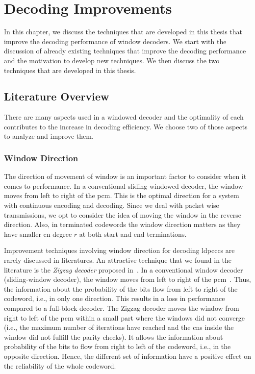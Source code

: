 \chapter{Decoding Improvements}\label{ch:dec_improve}
In this chapter, we discuss the techniques that are developed in this thesis that improve the decoding performance of window decoders. We start with the discussion of already existing techniques that improve the decoding performance and the motivation to develop new techniques. We then discuss the two techniques that are developed in this thesis.

\section{Literature Overview}
There are many aspects used in a windowed decoder and the optimality of each contributes to the increase in decoding efficiency. We choose two of those aspects to analyze and improve them.
\subsection{Window Direction}
The direction of movement of window is an important factor to consider when it comes to performance. In a conventional sliding-windowed decoder, the window moves from left to right of the \gls{pcm}. This is the optimal direction for a system with continuous encoding and decoding. Since we deal with packet wise transmissions, we opt to consider the idea of moving the window in the reverse direction. Also, in terminated codewords the window direction matters as they have smaller \gls{cn} degree $r$ at both start and end terminations.

Improvement techniques involving window direction for decoding \glspl{ldpccc} are rarely discussed in literatures. An attractive technique that we found in the literature is the \emph{Zigzag decoder} proposed in~\cite{Shadi2015}. In a conventional window decoder (sliding-window decoder), the window moves from left to right of the \gls{pcm}~\cite{Iyengar2012}. Thus, the information about the probability of the bits flow from left to right of the codeword, i.e., in only one direction. This results in a loss in performance compared to a full-block decoder. The Zigzag decoder moves the window from right to left of the \gls{pcm} within a small part where the windows did not converge (i.e., the maximum number of iterations have reached and the \glspl{cn} inside the window did not fulfill the parity checks). It allows the information about probability of the bits to flow from right to left of the codeword, i.e., in the opposite direction. Hence, the different set of information have a positive effect on the reliability of the whole codeword.

